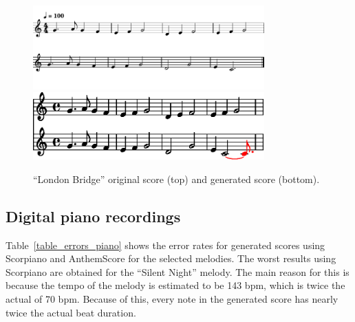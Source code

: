 \documentclass[conference]{IEEEtran}
\begin{document}
\begin{figure}[bt]
\centering
\vspace{-10pt}
\includegraphics[clip, width=3.5in]{london_bridge_original}
\includegraphics[clip, width=3.5in]{london_bridge_generated}
\caption{``London Bridge'' original score (top) and generated score (bottom).}
\label{fig_london_bridge_musescore}
\vspace{-2pt}
\end{figure}

\subsection{Digital piano recordings}

Table~\ref{table_errors_piano} shows the error rates for generated scores using Scorpiano and AnthemScore for the selected melodies.
The worst results using Scorpiano are obtained for the ``Silent Night'' melody.
The main reason for this is because the tempo of the melody is estimated to be 143 bpm, which is twice the actual of 70 bpm.
Because of this, every note in the generated score has nearly twice the actual beat duration.
\end{document}
